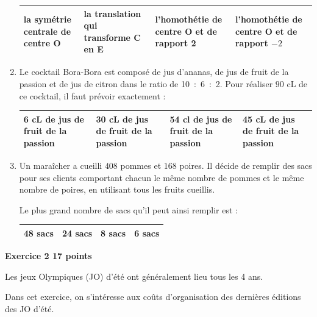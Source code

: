 \documentclass[11pt]{article}
\begin{document}
\begin{enumerate}
\begin{center}
\begin{tabularx}{\linewidth}{|*{4}{>{\small}X|}}\hline
la symétrie centrale de centre O&la translation qui transforme C en E&l'homothétie de centre O et de rapport 2&l'homothétie de centre O et de rapport $- 2$\\ \hline
\end{tabularx}
\end{center}

\item Le cocktail Bora-Bora est composé de jus d'ananas, de jus de fruit de la passion et de jus de citron dans le ratio de 10~:~6~:~2. Pour réaliser $90$ cL de ce cocktail, il faut prévoir exactement :

\begin{center}
\begin{tabularx}{\linewidth}{|*{4}{X|}}\hline
6 cL de jus de fruit de la passion&30 cL de jus de fruit de
la passion&54 cl de jus de fruit de la passion&45 cL de jus de fruit de 
la passion\\ \hline
\end{tabularx}
\end{center}

\item  Un maraîcher a cueilli $408$ pommes et $168$ poires. Il décide de remplir des sacs pour ses clients comportant chacun le même nombre de pommes et le même nombre de poires, en utilisant tous les fruits cueillis.

Le plus grand nombre de sacs qu'il peut ainsi remplir est :

\begin{center}
\begin{tabularx}{\linewidth}{|*{4}{X|}}\hline
48 sacs&24 sacs&8 sacs&6 sacs\\ \hline
\end{tabularx}
\end{center}
\end{enumerate}

\bigskip

\textbf{\large{}Exercice 2 \hfill 17 points}

\medskip

Les jeux Olympiques (JO) d'été ont généralement lieu tous les 4 ans.

Dans cet exercice, on s'intéresse aux coûts d'organisation des dernières éditions des JO d'été.
\end{document}
